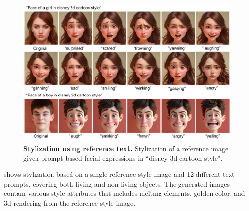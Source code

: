 \documentclass{article} %
\theoremstyle{plain}
\begin{document}
\begin{figure}[!tbh]
\includegraphics[width=\linewidth]{pics/expression-edit-supp_low.pdf}
\caption{
\textbf{Stylization using reference text.}
Stylization of a reference image given prompt-based facial expressions in ``disney 3d cartoon style".
}
\label{fig:expression-edit}
\end{figure}





 shows stylization based on a single reference style image and 12 different text prompts, covering both living and non-living objects.  
The generated images contain various style attributes that includes melting elements, golden color, and 3d rendering from the reference style image. 
\end{document}
